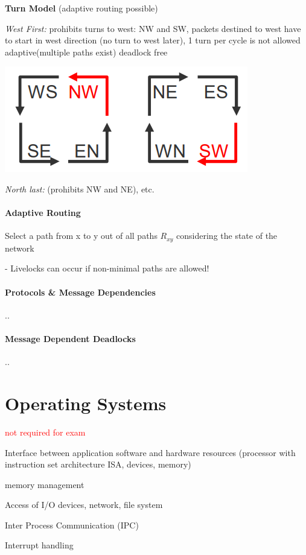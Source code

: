 \documentclass[fontsize=8pt]{scrartcl}
\begin{document}
\begin{multicols*}{4}
\textbf{Turn Model} (adaptive routing possible) 

\textit{West First:} prohibits turns to west: NW and SW, packets destined to west have to start in west direction (no turn to west later), 1 turn per cycle is not allowed adaptive(multiple paths exist) deadlock free

\begin{center}
  \centering
  \includegraphics[width=0.4\linewidth]{img/west_first.png}
  \label{fig:west_first}
\end{center}

\textit{North last:} (prohibits NW and NE), etc.


\paragraph{Adaptive Routing}\mbox{}

Select a path from x to y out of all paths $R_{xy}$ considering the state of the network

- Livelocks can occur if non-minimal paths are allowed!

\paragraph{Protocols \& Message Dependencies}..

\paragraph{Message Dependent Deadlocks}..

\section{Operating Systems} \textcolor{red}{not required for exam}

Interface between application software  and 
hardware resources (processor with instruction 
set architecture ISA, devices, memory)

memory management

Access of I/O devices, network, file system

Inter Process Communication (IPC)

Interrupt handling


\end{multicols*}
\end{document}
